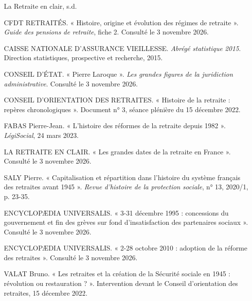 \newpage %


\begin{thebibliography}{La Retraite en clair, s.d.}

CFDT RETRAITÉS. « Histoire, origine et évolution des régimes de retraite ». \textit{Guide des pensions de retraite}, fiche 2. Consulté le 3 novembre 2026.

CAISSE NATIONALE D'ASSURANCE VIEILLESSE. \textit{Abrégé statistique 2015}. Direction statistiques, prospective et recherche, 2015.

CONSEIL D'ÉTAT. « Pierre Laroque ». \textit{Les grandes figures de la juridiction administrative}. Consulté le 3 novembre 2026.

CONSEIL D'ORIENTATION DES RETRAITES. « Histoire de la retraite : repères chronologiques ». Document n° 3, séance plénière du 15 décembre 2022.

FABAS Pierre-Jean. « L'histoire des réformes de la retraite depuis 1982 ». \textit{LégiSocial}, 24 mars 2023.

LA RETRAITE EN CLAIR. « Les grandes dates de la retraite en France ». Consulté le 3 novembre 2026.

SALY Pierre. « Capitalisation et répartition dans l'histoire du système français des retraites avant 1945 ». \textit{Revue d'histoire de la protection sociale}, n° 13, 2020/1, p. 23-35.

ENCYCLOPÆDIA UNIVERSALIS. « 3-31 décembre 1995 : concessions du gouvernement et fin des grèves sur fond d'insatisfaction des partenaires sociaux ». Consulté le 3 novembre 2026.

ENCYCLOPÆDIA UNIVERSALIS. « 2-28 octobre 2010 : adoption de la réforme des retraites ». Consulté le 3 novembre 2026.

VALAT Bruno. « Les retraites et la création de la Sécurité sociale en 1945 : révolution ou restauration ? ». Intervention devant le Conseil d'orientation des retraites, 15 décembre 2022.


\end{thebibliography}
